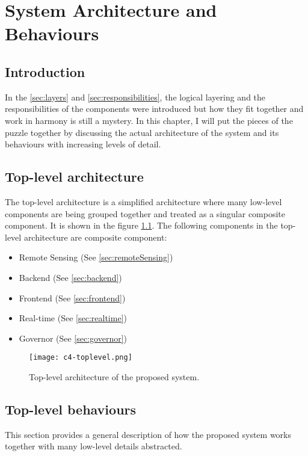 \documentclass[../thesis.tex]{subfiles}
\begin{document}
\chapter{System Architecture and Behaviours}
\label{chap:arch}

\section{Introduction}

In the \autoref{sec:layers} and \autoref{sec:responsibilities}, the logical layering and the responsibilities of the components were introduced but how they fit together and work in harmony is still a mystery. In this chapter, I will put the pieces of the puzzle together by discussing the actual architecture of the system and its behaviours with increasing levels of detail.


\section{Top-level architecture}

The top-level architecture is a simplified architecture where many low-level components are being grouped together and treated as a singular composite component. It is shown in the figure \ref{fig:toplevel}. The following components in the top-level architecture are composite component:

\begin{itemize}
\item Remote Sensing (See \autoref{sec:remoteSensing})
\item Backend (See \autoref{sec:backend})
\item Frontend (See \autoref{sec:frontend})
\item Real-time (See \autoref{sec:realtime})
\item Governor (See \autoref{sec:governor})
\end{itemize}


\begin{figure}[!ht]
\centering
\texttt{[image: c4-toplevel.png]}
\caption{Top-level architecture of the proposed system.}
\label{fig:toplevel}
\end{figure}

\section{Top-level behaviours}

This section provides a general description of how the proposed system works together with many low-level details abstracted.
\end{document}
